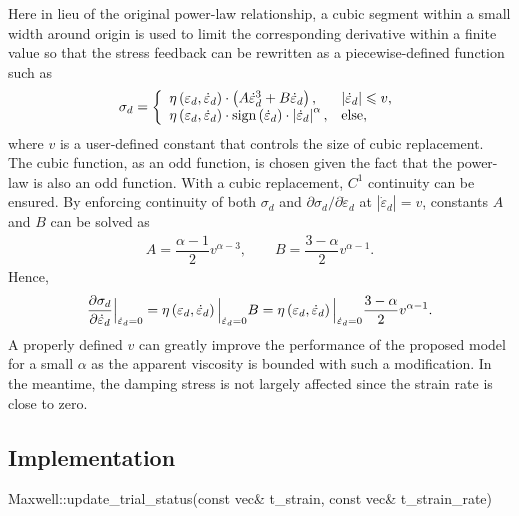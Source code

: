 Here in lieu of the original power-law relationship, a cubic segment within a small width around origin is used to limit the corresponding derivative within a finite value so that the stress feedback can be rewritten as a piecewise-defined function such as
\begin{gather}
\sigma_d=\left\{
\begin{array}{ll}
\eta\left(\varepsilon_d,\dot\varepsilon_d\right)\cdot\left(A\dot{\varepsilon}_d^3+B\dot{\varepsilon}_d\right),&\left\lvert\dot{\varepsilon}_d\right\rvert\leqslant{}v,\\
\eta\left(\varepsilon_d,\dot\varepsilon_d\right)\cdot\text{sign}\left(\dot{\varepsilon}_d\right)\cdot\left\lvert\dot{\varepsilon}_d\right\rvert^{\alpha},&\text{else},
\end{array}
\right.
\end{gather}
where $v$ is a user-defined constant that controls the size of cubic replacement. The cubic function, as an odd function, is chosen given the fact that the power-law  is also an odd function. With a cubic replacement, $C^1$ continuity can be ensured. By enforcing continuity of both $\sigma_d$ and $\partial\sigma_d/\partial\dot\varepsilon_d$ at $\left\lvert\dot{\varepsilon}_d\right\rvert=v$, constants $A$ and $B$ can be solved as
\begin{gather}
A=\dfrac{\alpha-1}{2}v^{\alpha-3},\qquad
B=\dfrac{3-\alpha}{2}v^{\alpha-1}.
\end{gather}
Hence,
\begin{gather}\label{eq:max_der}
\dfrac{\partial{\sigma_d}}{\partial{\dot{\varepsilon}_d}}\Big\vert_{\dot{\varepsilon}_d=0}=\eta\left(\varepsilon_d,\dot\varepsilon_d\right)\Big\vert_{\dot{\varepsilon}_d=0}B=\eta\left(\varepsilon_d,\dot\varepsilon_d\right)\Big\vert_{\dot{\varepsilon}_d=0}\dfrac{3-\alpha}{2}v^{\alpha-1}.
\end{gather}
A properly defined $v$ can greatly improve the performance of the proposed model for a small $\alpha$ as the apparent viscosity is bounded with such a modification. In the meantime, the damping stress is not largely affected since the strain rate is close to zero.
\subsection{Implementation}
\begin{cppcode}
Maxwell::update_trial_status(const vec& t_strain, const vec& t_strain_rate)
\end{cppcode}